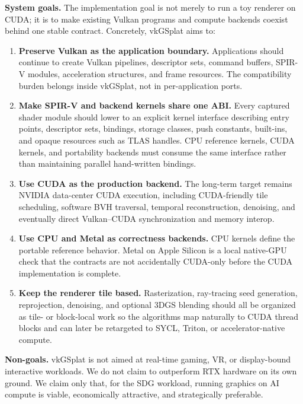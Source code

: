 \documentclass[10pt,journal]{IEEEtran}
\begin{document}
\textbf{System goals.} The implementation goal is not merely to run a
toy renderer on CUDA; it is to make existing Vulkan programs and
compute backends coexist behind one stable contract. Concretely, vkGSplat
aims to:

\begin{enumerate}
    \item \textbf{Preserve Vulkan as the application boundary.}
    Applications should continue to create Vulkan pipelines, descriptor
    sets, command buffers, SPIR-V modules, acceleration structures, and
    frame resources. The compatibility burden belongs inside vkGSplat,
    not in per-application ports.

    \item \textbf{Make SPIR-V and backend kernels share one ABI.}
    Every captured shader module should lower to an explicit kernel
    interface describing entry points, descriptor sets, bindings,
    storage classes, push constants, built-ins, and opaque resources
    such as TLAS handles. CPU reference kernels, CUDA kernels, and
    portability backends must consume the same interface rather than
    maintaining parallel hand-written bindings.

    \item \textbf{Use CUDA as the production backend.} The long-term
    target remains NVIDIA data-center CUDA execution, including
    CUDA-friendly tile scheduling, software BVH traversal, temporal
    reconstruction, denoising, and eventually direct Vulkan--CUDA
    synchronization and memory interop.

    \item \textbf{Use CPU and Metal as correctness backends.} CPU
    kernels define the portable reference behavior. Metal on Apple
    Silicon is a local native-GPU check that the contracts are not
    accidentally CUDA-only before the CUDA implementation is complete.

    \item \textbf{Keep the renderer tile based.} Rasterization,
    ray-tracing seed generation, reprojection, denoising, and optional
    3DGS blending should all be organized as tile- or block-local work
    so the algorithms map naturally to CUDA thread blocks and can later
    be retargeted to SYCL, Triton, or accelerator-native compute.
\end{enumerate}

\textbf{Non-goals.} vkGSplat is not aimed at real-time gaming, VR, or
display-bound interactive workloads. We do not claim to outperform RTX
hardware on its own ground. We claim only that, for the SDG workload,
running graphics on AI compute is viable, economically attractive, and
strategically preferable.
\end{document}
